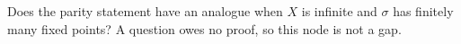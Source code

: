 \begin{question}\label{dm-0007}
Does the parity statement have an analogue when $X$ is infinite and $\sigma$ has finitely many fixed points? A question owes no proof, so this node is not a gap.
\end{question}